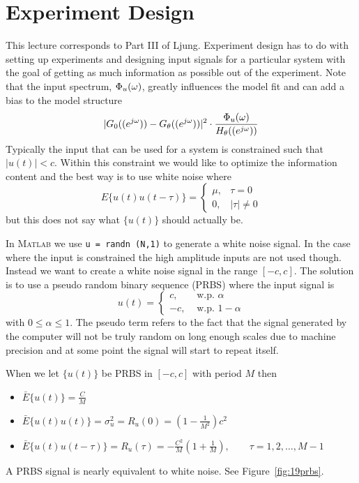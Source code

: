 \mainmatter%
\setcounter{page}{1}

\lectureseries[\course]{\course}

\date{December 8, 2009}

\setaddress%

\setcounter{lecture}{18}
\setcounter{chapter}{18}


\section{Experiment Design}
This lecture corresponds to Part III of Ljung.
Experiment design has to do with setting up experiments and designing input signals for a particular system with the goal of getting as much information as possible out of the experiment.
Note that the input spectrum, $\Phi_u(\omega)$, greatly influences the model fit and can add a bias to the model structure
$$|G_0((e^{j\omega}))-G_\theta((e^{j\omega}))|^2 \cdot \frac{\Phi_u(\omega)}{H_\theta((e^{j\omega}))}$$
Typically the input that can be used for a system is constrained such that $|u(t)|<c$.
Within this constraint we would like to optimize the information content and the best way is to use white noise where
$$E\{u(t)u(t-\tau)\} = \begin{cases} \mu, & \tau=0 \\ 0, & |\tau|\neq0 \end{cases}$$
but this does not say what $\{u(t)\}$ should actually be.

In \textsc{Matlab} we use \texttt{u = randn (N,1)} to generate a white noise signal.
In the case where the input is constrained the high amplitude inputs are not used though.
Instead we want to create a white noise signal in the range $[-c,c]$.
The solution is to use a pseudo random binary sequence (PRBS) where the input signal is
$$u(t) = \begin{cases} c, & \text{~w.p.~} \alpha \\ -c, & \text{~w.p.~} 1-\alpha \end{cases}$$
with $0\leq\alpha\leq1$.
The pseudo term refers to the fact that the signal generated by the computer will not be truly random on long enough scales due to machine precision and at some point the signal will start to repeat itself.

When we let $\{u(t)\}$ be PRBS in $[-c,c]$ with period $M$ then
\begin{itemize}
\item $\bar{E}\{u(t)\} = \frac{C}{M}$
\item $\bar{E}\{u(t)u(t)\} = \sigma_u^2 = R_u(0) = (1-\frac{1}{M^2})c^2$
\item $\bar{E}\{u(t)u(t-\tau)\} = R_u(\tau) = -\frac{C^2}{M}(1+\frac{1}{M}), \qquad \tau=1,2,\ldots,M-1$
\end{itemize}
A PRBS signal is nearly equivalent to white noise.
See Figure~\ref{fig:19prbs}.

